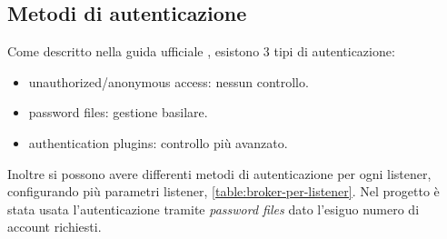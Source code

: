 \subsection{Metodi di autenticazione}
\label{sec:broker-autenticazione}
Come descritto nella guida ufficiale \cite{mosquitto-auth}, esistono 3 tipi di autenticazione:
\begin{itemize}
    \item unauthorized/anonymous access: nessun controllo.
    \item password files: gestione basilare.
    \item authentication plugins: controllo più avanzato.
\end{itemize}
Inoltre si possono avere differenti metodi di autenticazione per ogni listener, configurando più parametri listener,
\ref{table:broker-per-listener}.\newline
Nel progetto è stata usata l'autenticazione tramite \textit{password files} dato l'esiguo numero di account richiesti.


